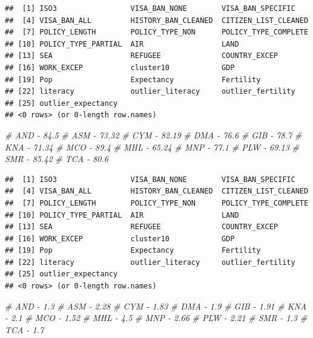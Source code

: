 \documentclass[]{article}
\newenvironment{Shaded}{\begin{snugshade}}{\end{snugshade}}
\newcommand{\CommentTok}[1]{\textcolor[rgb]{0.56,0.35,0.01}{\textit{#1}}}
\newcommand{\KeywordTok}[1]{\textcolor[rgb]{0.13,0.29,0.53}{\textbf{#1}}}
\newcommand{\NormalTok}[1]{#1}
\newcommand{\OperatorTok}[1]{\textcolor[rgb]{0.81,0.36,0.00}{\textbf{#1}}}
\begin{document}
\begin{verbatim}
##  [1] ISO3                 VISA_BAN_NONE        VISA_BAN_SPECIFIC   
##  [4] VISA_BAN_ALL         HISTORY_BAN_CLEANED  CITIZEN_LIST_CLEANED
##  [7] POLICY_LENGTH        POLICY_TYPE_NON      POLICY_TYPE_COMPLETE
## [10] POLICY_TYPE_PARTIAL  AIR                  LAND                
## [13] SEA                  REFUGEE              COUNTRY_EXCEP       
## [16] WORK_EXCEP           cluster10            GDP                 
## [19] Pop                  Expectancy           Fertility           
## [22] literacy             outlier_literacy     outlier_fertility   
## [25] outlier_expectancy  
## <0 rows> (or 0-length row.names)
\end{verbatim}

\begin{Shaded}
\begin{Highlighting}[]
\CommentTok{# AND - 84.5}
\CommentTok{# ASM - 73.32}
\CommentTok{# CYM - 82.19}
\CommentTok{# DMA - 76.6}
\CommentTok{# GIB - 78.7}
\CommentTok{# KNA - 71.34}
\CommentTok{# MCO - 89.4}
\CommentTok{# MHL - 65.24}
\CommentTok{# MNP - 77.1}
\CommentTok{# PLW - 69.13}
\CommentTok{# SMR - 85.42}
\CommentTok{# TCA - 80.6}
\end{Highlighting}
\end{Shaded}

\begin{Shaded}
\end{Shaded}

\begin{verbatim}
##  [1] ISO3                 VISA_BAN_NONE        VISA_BAN_SPECIFIC   
##  [4] VISA_BAN_ALL         HISTORY_BAN_CLEANED  CITIZEN_LIST_CLEANED
##  [7] POLICY_LENGTH        POLICY_TYPE_NON      POLICY_TYPE_COMPLETE
## [10] POLICY_TYPE_PARTIAL  AIR                  LAND                
## [13] SEA                  REFUGEE              COUNTRY_EXCEP       
## [16] WORK_EXCEP           cluster10            GDP                 
## [19] Pop                  Expectancy           Fertility           
## [22] literacy             outlier_literacy     outlier_fertility   
## [25] outlier_expectancy  
## <0 rows> (or 0-length row.names)
\end{verbatim}

\begin{Shaded}
\begin{Highlighting}[]
\CommentTok{# AND - 1.3}
\CommentTok{# ASM - 2.28}
\CommentTok{# CYM - 1.83}
\CommentTok{# DMA - 1.9}
\CommentTok{# GIB - 1.91}
\CommentTok{# KNA - 2.1}
\CommentTok{# MCO - 1.52}
\CommentTok{# MHL - 4.5}
\CommentTok{# MNP - 2.66}
\CommentTok{# PLW - 2.21}
\CommentTok{# SMR - 1.3}
\CommentTok{# TCA - 1.7}
\end{Highlighting}
\end{Shaded}
\end{document}
